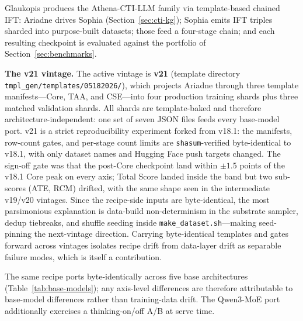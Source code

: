 \documentclass[conference]{IEEEtran}
\providecommand{\hfid}[1]{{\small\nolinkurl{#1}}}
\begin{document}
Glaukopis produces the Athena-CTI-LLM family via template-based chained IFT: Ariadne drives Sophia (Section~\ref{sec:cti-kg}); Sophia emits IFT triples sharded into purpose-built datasets; those feed a four-stage chain; and each resulting checkpoint is evaluated against the portfolio of Section~\ref{sec:benchmarks}.

\textbf{The v21 vintage.} The active vintage is \textbf{v21} (template directory \hfid{tmpl_gen/templates/05182026/}), which projects Ariadne through three template manifests---Core, TAA, and CSE---into four production training shards plus three matched validation shards. All shards are template-baked and therefore architecture-independent: one set of seven JSON files feeds every base-model port. v21 is a strict reproducibility experiment forked from v18.1: the manifests, row-count gates, and per-stage count limits are \texttt{shasum}-verified byte-identical to v18.1, with only dataset names and Hugging Face push targets changed. The sign-off gate was that the post-Core checkpoint land within $\pm1.5$ points of the v18.1 Core peak on every axis; Total Score landed inside the band but two sub-scores (ATE, RCM) drifted, with the same shape seen in the intermediate v19/v20 vintages. Since the recipe-side inputs are byte-identical, the most parsimonious explanation is data-build non-determinism in the substrate sampler, dedup tiebreaks, and shuffle seeding inside \hfid{make_dataset.sh}---making seed-pinning the next-vintage direction. Carrying byte-identical templates and gates forward across vintages isolates recipe drift from data-layer drift as separable failure modes, which is itself a contribution.

The same recipe ports byte-identically across five base architectures (Table~\ref{tab:base-models}); any axis-level differences are therefore attributable to base-model differences rather than training-data drift. The Qwen3-MoE port additionally exercises a thinking-on/off A/B at serve time.
\end{document}

